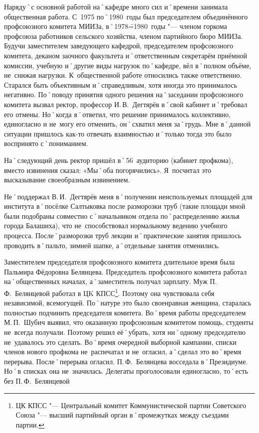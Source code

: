 Наряду˚с основной работой на˚кафедре много сил и˚времени занимала общественная работа. С~1975 по˚1980~годы был председателем объединённого профсоюзного комитета МИИЗа, в˚1978\==1980~годы "--- членом горкома профсоюза работников сельского хозяйства, членом партийного бюро МИИЗа. Будучи заместителем заведующего кафедрой, председателем профсоюзного комитета, деканом заочного факультета и˚ответственным секретарём приёмной комиссии, учебную и˚другие виды нагрузок по˚кафедре, вёл в˚полном объёме, не~снижая нагрузки. К~общественной работе относились также ответственно. Старался быть объективным и˚справедливым, хотя иногда это принималось негативно. По˚поводу принятия одного решения на˚заседании профсоюзного комитета вызвал ректор, профессор И.\,В.~Дегтярёв в˚свой кабинет и˚требовал его отмены. Но˚когда я˚ответил, что решение принималось коллективно, единогласно и не~могу его отменить, он˚схватил меня за˚грудь. Мне в˚данной ситуации пришлось как-то отвечать взаимностью и˚только тогда это было воспринято с˚пониманием.

На˚следующий день ректор пришёл в˚56~аудиторию (кабинет профкома), вместо извинения сказал: «Мы˚оба погорячились». Я~посчитал это высказывание своеобразным извинением.

Не˚поддержал В.\,И.~Дегтярёв меня в˚получении неиспользуемых площадей для института в˚посёлке Салтыковка после разморозки труб (такие площади мной были подобраны совместно с˚начальником отдела по˚распределению жилья города Балашиха), что не~способствовал нормальному ведению учебного процесса. После˚разморозки труб лекции и˚практические занятия пришлось проводить в˚пальто, зимней шапке, а˚отдельные занятия отменились.

Заместителем председателя профсоюзного комитета длительное время была Пальмира Фёдоровна Белянцева. Председатель профсоюзного комитета работал на˚общественных началах, а˚заместитель получал зарплату. Муж П.\,Ф.~Белянцевой работал в ЦK КПСС\footnote{ЦК КПСС "--- Центральный комитет Коммунистической партии Советского Союза "--- высший партийный орган в˚промежутках между съездами партии.}. Поэтому она чувствовала себя независимой, всемогущей. По˚натуре это было своенравная женщина, старалась полностью подчинить председателя комитета. Во˚время работы председателем М.\,П.~Шубич выявил, что оказанную профсоюзным комитетом помощь, студенты не~всегда получали. Поэтому решил её˚убрать, хотя ни˚одному председателю не~удавалось это сделать. Во˚время очередной выборной кампании, списки членов нового профкома не~распечатал и не~огласил, а˚сделал это во˚время перерыва. После˚перерыва огласил. П.\,Ф.~Белянцева восседала в˚Президиуме. Но˚в списках она не~значилась. Делегаты проголосовали единогласно, то˚есть без П.\,Ф.~Белянцевой 

